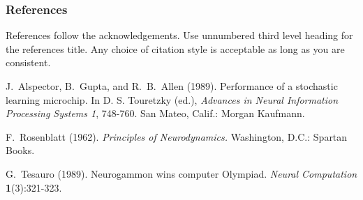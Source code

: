 \documentclass[letterpaper]{article}
\begin{document}
\subsubsection*{References}

References follow the acknowledgements.  Use unnumbered third level
heading for the references title.  Any choice of citation style is
acceptable as long as you are consistent.


J.~Alspector, B.~Gupta, and R.~B.~Allen  (1989). Performance of a
stochastic learning microchip.  In D. S. Touretzky (ed.), {\it Advances
in Neural Information Processing Systems 1}, 748-760.  San Mateo, Calif.:
Morgan Kaufmann.

F.~Rosenblatt (1962). {\it Principles of Neurodynamics.} Washington,
D.C.: Spartan Books.

G.~Tesauro (1989). Neurogammon wins computer Olympiad.  {\it Neural
Computation} {\bf 1}(3):321-323.
\end{document}
